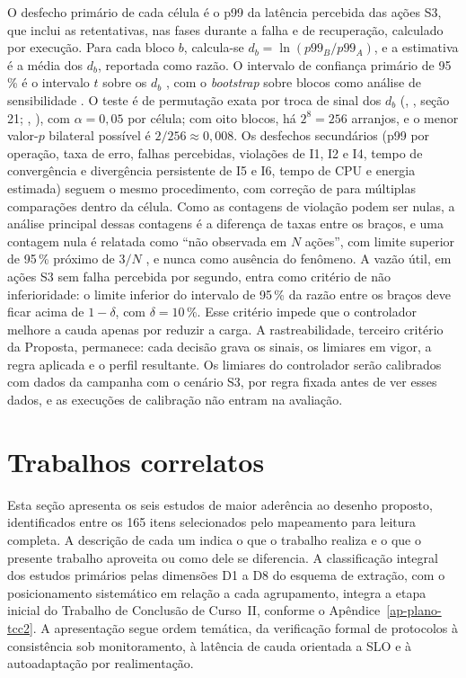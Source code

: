 O desfecho primário de cada célula é o p99 da latência percebida das ações S3, que inclui as retentativas, nas fases durante a falha e de recuperação, calculado por execução. Para cada bloco $b$, calcula-se $d_b = \ln(p99_B / p99_A)$, e a estimativa é a média dos $d_b$, reportada como razão. O intervalo de confiança primário de 95\,\% é o intervalo $t$ sobre os $d_b$ \citep{student_probable_error_1908}, com o \emph{bootstrap} sobre blocos como análise de sensibilidade \citep{efron_tibshirani_bootstrap_1993}. O teste é de permutação exata por troca de sinal dos $d_b$ (\citeauthor{fisher_design_experiments_1935}, \citeyear{fisher_design_experiments_1935}, seção 21; \citeauthor{good_permutation_tests_2005}, \citeyear{good_permutation_tests_2005}), com $\alpha = 0{,}05$ por célula; com oito blocos, há $2^8 = 256$ arranjos, e o menor valor-$p$ bilateral possível é $2/256 \approx 0{,}008$. Os desfechos secundários (p99 por operação, taxa de erro, falhas percebidas, violações de I1, I2 e I4, tempo de convergência e divergência persistente de I5 e I6, tempo de CPU e energia estimada) seguem o mesmo procedimento, com correção de \citet{holm_sequential_1979} para múltiplas comparações dentro da célula.
Como as contagens de violação podem ser nulas, a análise principal dessas contagens é a diferença de taxas entre os braços, e uma contagem nula é relatada como ``não observada em $N$ ações'', com limite superior de 95\,\% próximo de $3/N$ \citep{hanley_lippmanhand_zero_1983}, e nunca como ausência do fenômeno.
A vazão útil, em ações S3 sem falha percebida por segundo, entra como critério de não inferioridade: o limite inferior do intervalo de 95\,\% da razão entre os braços deve ficar acima de $1 - \delta$, com $\delta = 10\,\%$. Esse critério impede que o controlador melhore a cauda apenas por reduzir a carga. A rastreabilidade, terceiro critério da Proposta, permanece: cada decisão grava os sinais, os limiares em vigor, a regra aplicada e o perfil resultante. Os limiares do controlador serão calibrados com dados da campanha com o cenário S3, por regra fixada antes de ver esses dados, e as execuções de calibração não entram na avaliação.

\section*{Trabalhos correlatos}
\label{sec-trabalhos-correlatos}

Esta seção apresenta os seis estudos de maior aderência ao desenho proposto, identificados entre os 165 itens selecionados pelo mapeamento para leitura completa. A descrição de cada um indica o que o trabalho realiza e o que o presente trabalho aproveita ou como dele se diferencia. A classificação integral dos estudos primários pelas dimensões D1 a D8 do esquema de extração, com o posicionamento sistemático em relação a cada agrupamento, integra a etapa inicial do Trabalho de Conclusão de Curso~II, conforme o Apêndice~\ref{ap-plano-tcc2}. A apresentação segue ordem temática, da verificação formal de protocolos à consistência sob monitoramento, à latência de cauda orientada a SLO e à autoadaptação por realimentação.

